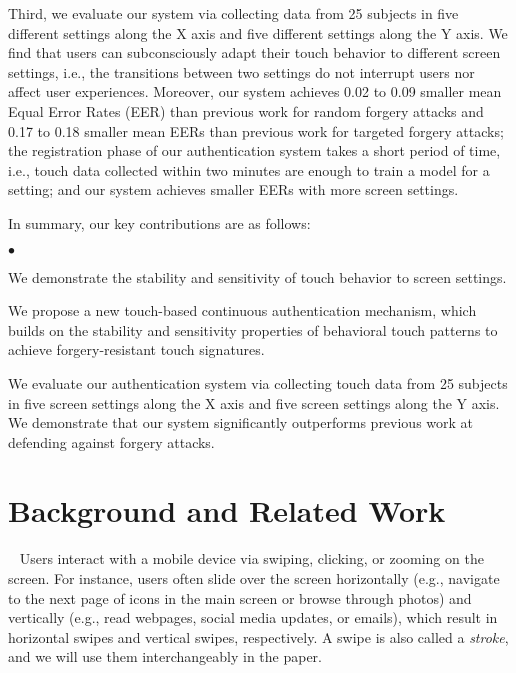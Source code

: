 \documentclass{sig-alternate-05-2015}
\newcommand{\myparatight}[1]{\smallskip\noindent{\bf {#1}:}~}
\newenvironment{packeditemize}{\begin{list}{$\bullet$}{\setlength{\itemsep}{2pt}\addtolength{\labelwidth}{4pt}\setlength{\leftmargin}{20pt}\setlength{\listparindent}{\parindent}\setlength{\parsep}{0pt}\setlength{\topsep}{0pt}}}{\end{list}}
\begin{document}
Third, we evaluate our system via collecting data from 25 subjects in five
different settings along the X axis and five different settings along the Y
axis.  We find that users can subconsciously adapt their touch behavior to
different screen settings, i.e., the transitions between two settings do not
interrupt  users nor affect user experiences. 
Moreover, our system achieves 0.02 to 0.09 smaller  mean Equal Error Rates
(EER) than previous work
for random forgery attacks and 0.17 to 0.18 smaller mean EERs than previous work
for targeted forgery attacks; the  registration phase of our authentication
system takes a short period of time, i.e., touch data collected within two
minutes  are enough to train a model for a setting; and our system achieves
smaller EERs with more screen settings.

In summary, our key contributions are as follows:
\begin{packeditemize}
  \item We demonstrate the stability and sensitivity of touch behavior to screen
settings.
	\item We propose a new touch-based continuous authentication mechanism, which
builds on the stability and sensitivity properties of behavioral touch patterns
to achieve forgery-resistant touch signatures. 
	\item We evaluate our authentication system via collecting touch data from
 25 subjects in five  screen settings along the X axis and five screen settings
along the Y axis. We demonstrate that our system significantly outperforms
previous work at defending against forgery attacks. 
\end{packeditemize}














\section{Background and Related Work} \myparatight{Screen settings}
Users  interact with a mobile device via swiping, clicking, or zooming on the
screen. For instance, users often slide over the screen horizontally (e.g.,
navigate to the next page of icons in the main screen or browse through photos)
and vertically (e.g., read webpages, social media updates, or emails), which
result in horizontal swipes and vertical swipes, respectively. A swipe is also
called a \emph{stroke}, and we will use them interchangeably in the paper. 
\end{document}

